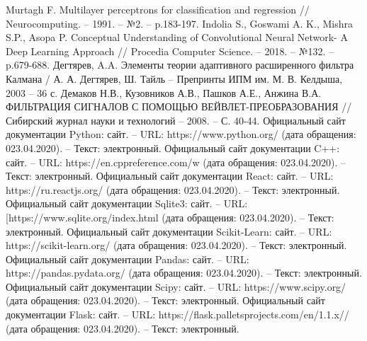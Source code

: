 \documentclass[a4paper,article,14pt]{extarticle}
\begin{document}
\begin{thebibliography}{1}
 Murtagh F. Multilayer perceptrons for classification and regression // Neurocomputing. – 1991. – №2. –  p.183-197.
 Indolia S., Goswami A. K., Mishra S.P., Asopa P. Conceptual Understanding of Convolutional Neural Network- A Deep Learning Approach // Procedia Computer Science. – 2018. – №132. –  p.679-688.
 Дегтярев, A.A. Элементы теории адаптивного расширенного фильтра Калмана / А. А. Дегтярев, Ш. Тайль – Препринты ИПМ им. М. В. Келдыша, 2003 – 36 с.
 Демаков Н.В., Кузовников А.В., Пашков А.Е., Анжина В.А.  ФИЛЬТРАЦИЯ СИГНАЛОВ С ПОМОЩЬЮ ВЕЙВЛЕТ-ПРЕОБРАЗОВАНИЯ // Сибирский журнал науки и технологий – 2008.  – С. 40-44.
 Официальный сайт документации Python: сайт. – URL: https://www.python.org/ (дата обращения: 023.04.2020). – Текст: электронный.
 Официальный сайт документации C++: сайт. – URL: https://en.cppreference.com/w (дата обращения: 023.04.2020). – Текст: электронный.
 Официальный сайт документации React: сайт. – URL: https://ru.reactjs.org/ (дата обращения: 023.04.2020). – Текст: электронный.
 Официальный сайт документации Sqlite3: сайт. – URL: [https://www.sqlite.org/index.html (дата обращения: 023.04.2020). – Текст: электронный.
 Официальный сайт документации Scikit-Learn: сайт. – URL: https://scikit-learn.org/ (дата обращения: 023.04.2020). – Текст: электронный.
 Официальный сайт документации Pandas: сайт. – URL: https://pandas.pydata.org/ (дата обращения: 023.04.2020). – Текст: электронный.
 Официальный сайт документации Scipy: сайт. – URL: https://www.scipy.org/ (дата обращения: 023.04.2020). – Текст: электронный.
 Официальный сайт документации Flask: сайт. – URL: https://flask.palletsprojects.com/en/1.1.x// (дата обращения: 023.04.2020). – Текст: электронный.

\end{thebibliography}
\end{document}
